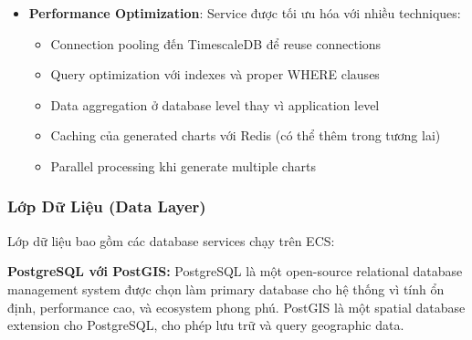 \begin{itemize}
    \item \textbf{Performance Optimization}: Service được tối ưu hóa với nhiều techniques:
        \begin{itemize}
            \item Connection pooling đến TimescaleDB để reuse connections
            \item Query optimization với indexes và proper WHERE clauses
            \item Data aggregation ở database level thay vì application level
            \item Caching của generated charts với Redis (có thể thêm trong tương lai)
            \item Parallel processing khi generate multiple charts
        \end{itemize}
\end{itemize}

\subsubsection{Lớp Dữ Liệu (Data Layer)}

Lớp dữ liệu bao gồm các database services chạy trên ECS:

\textbf{PostgreSQL với PostGIS:} PostgreSQL là một open-source relational database management system được chọn làm primary database cho hệ thống vì tính ổn định, performance cao, và ecosystem phong phú. PostGIS là một spatial database extension cho PostgreSQL, cho phép lưu trữ và query geographic data.

